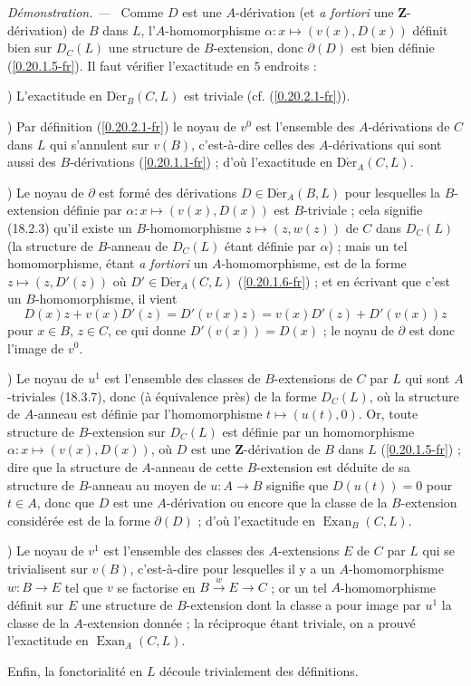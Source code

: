 \documentclass[10pt,oneside]{book}
\newcommand{\sref}[1]{(\ref{#1})}
\newenvironment{proof}{%
  \par\medskip\noindent\textit{Démonstration. ---\ }}{\par}
\begin{document}
\begin{proof}
Comme $D$ est une $A$-dérivation (et \emph{a fortiori} une
$\mathbf{Z}$-dérivation) de $B$ dans $L$, l'$A$-homomorphisme
$\alpha:x\mapsto(v(x),D(x))$ définit bien sur $D_C(L)$ une structure de
$B$-extension, donc $\partial(D)$ est bien définie \sref{0.20.1.5-fr}. Il
faut vérifier l'exactitude en $5$ endroits :

\medskip
{})\enspace
L'exactitude en $\operatorname{D\acute{e}r}_B(C,L)$ est triviale (cf.
\sref{0.20.2.1-fr}).

\medskip
{})\enspace
Par définition \sref{0.20.2.1-fr} le noyau de $v^0$ est l'ensemble des
$A$-dérivations de $C$ dans $L$ qui s'annulent sur $v(B)$, c'est-à-dire
celles des $A$-dérivations qui sont aussi des $B$-dérivations
\sref{0.20.1.1-fr} ; d'où l'exactitude en $\operatorname{D\acute{e}r}_A(C,L)$.

\medskip
{})\enspace
Le noyau de $\partial$ est formé des dérivations
$D\in\operatorname{D\acute{e}r}_A(B,L)$ pour lesquelles la $B$-extension définie par
$\alpha:x\mapsto(v(x),D(x))$ est $B$-triviale ; cela signifie (18.2.3) qu'il
existe un $B$-homomorphisme $z\mapsto(z,w(z))$ de $C$ dans $D_C(L)$ (la
structure de $B$-anneau de $D_C(L)$ étant définie par $\alpha$) ; mais un tel
homomorphisme, étant \emph{a fortiori} un $A$-homomorphisme, est de la forme
$z\mapsto(z,D'(z))$ où $D'\in\operatorname{D\acute{e}r}_A(C,L)$
\sref{0.20.1.6-fr} ; et en écrivant que c'est un $B$-homomorphisme, il vient
\[
  D(x)z+v(x)D'(z)=D'(v(x)z)=v(x)D'(z)+D'(v(x))z
\]
pour $x\in B$, $z\in C$, ce qui donne $D'(v(x))=D(x)$ ; le noyau de
$\partial$ est donc l'image de $v^0$.

\medskip
{})\enspace
Le noyau de $u^1$ est l'ensemble des classes de $B$-extensions de $C$ par
$L$ qui sont $A$-triviales (18.3.7), donc (à équivalence près) de la forme
$D_C(L)$, où la structure de $A$-anneau est définie par l'homomorphisme
$t\mapsto(u(t),0)$. Or, toute structure de $B$-extension sur $D_C(L)$ est
définie par un homomorphisme $\alpha:x\mapsto(v(x),D(x))$, où $D$ est une
$\mathbf{Z}$-dérivation de $B$ dans $L$ \sref{0.20.1.5-fr} ; dire que la
structure de $A$-anneau de cette $B$-extension est déduite de sa structure de
$B$-anneau au moyen de $u:A\to B$ signifie que $D(u(t))=0$ pour $t\in A$,
donc que $D$ est une $A$-dérivation ou encore que la classe de la $B$-extension
considérée est de la forme $\partial(D)$ ; d'où l'exactitude en
$\operatorname{Exan}_B(C,L)$.

\medskip
{})\enspace
Le noyau de $v^1$ est l'ensemble des classes des $A$-extensions $E$ de $C$
par $L$ qui se trivialisent sur $v(B)$, c'est-à-dire pour lesquelles il y a un
$A$-homomorphisme $w:B\to E$ tel que $v$ se factorise en
$B\xrightarrow{w}E\to C$ ; or un tel $A$-homomorphisme définit sur $E$ une
structure de $B$-extension dont la classe a pour image par $u^1$ la classe de
la $A$-extension donnée ; la réciproque étant triviale, on a prouvé
l'exactitude en $\operatorname{Exan}_A(C,L)$.

Enfin, la fonctorialité en $L$ découle trivialement des définitions.
\end{proof}
\end{document}
